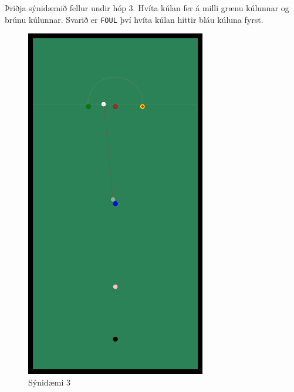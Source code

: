 Þriðja sýnidæmið fellur undir hóp $3$. Hvíta kúlan fer á milli grænu kúlunnar og brúnu kúlunnar. Svarið er \texttt{FOUL} því hvíta kúlan hittir bláu kúluna fyrst.
\begin{figure}[ht!]
  \centering
    \includegraphics[width=0.7\textwidth]{sample3}
  \caption{Sýnidæmi 3}
\end{figure}

